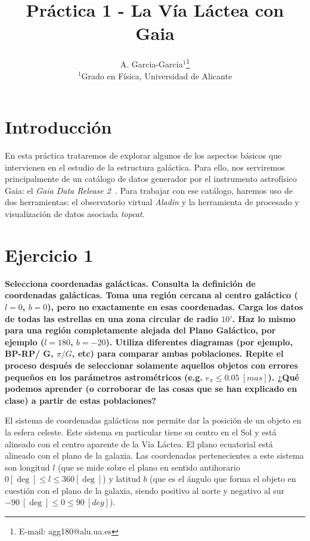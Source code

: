 \documentclass[a4paper,fleqn,usenatbib]{mnras}
\title[Short title, max. 45 characters]{Práctica 1 - La Vía Láctea con Gaia}
\author[A. Garcia-Garcia et al.]{
A. Garcia-Garcia$^{1}$\thanks{E-mail: agg180@alu.ua.es}
\\
$^{1}$Grado en Física, Universidad de Alicante\\
}
\date{}
\begin{document}
\label{firstpage}
\pagerange{\pageref{firstpage}--\pageref{lastpage}}
\maketitle





\section{Introducción}

En esta práctica trataremos de explorar algunos de los aspectos básicos que intervienen en el estudio de la estructura galáctica. Para ello, nos serviremos principalmente de un catálogo de datos generador por el instrumento astrofísico Gaia: el \emph{Gaia Data Release 2}~\cite{Gaia2018}. Para trabajar con ese catálogo, haremos uso de dos herramientas: el observatorio virtual \emph{Aladin} y la herramienta de procesado y visualización de datos asociada \emph{topcat}.

\section{Ejercicio 1}

\textbf{Selecciona coordenadas galácticas. Consulta la definición de coordenadas galácticas. Toma una región
cercana al centro galáctico ($l=0$, $b=0$), pero no exactamente en esas coordenadas. Carga los datos de
todas las estrellas en una zona circular de radio $10'$. Haz lo mismo para una región completamente alejada
del Plano Galáctico, por ejemplo ($l=180$, $b=-20$). Utiliza diferentes diagramas (por ejemplo, BP-RP/
G, $\pi/G$, etc) para comparar ambas poblaciones. Repite el proceso después de seleccionar solamente aquellos
objetos con errores pequeños en los parámetros astrométricos (e.g. $e_\pi \leq 0.05 ~[mas]$). ¿Qué podemos aprender
(o corroborar de las cosas que se han explicado en clase) a partir de estas poblaciones?}

El sistema de coordenadas galácticas nos permite dar la posición de un objeto en la esfera celeste. Este sistema en particular tiene su centro en el Sol y está alineado con el centro aparente de la Vía Láctea. El plano ecuatorial está alineado con el plano de la galaxia. Las coordenadas pertenecientes a este sistema son longitud $l$ (que se mide sobre el plano en sentido antihorario $0 [\deg] \leq l \leq 360 [\deg]$) y latitud $b$ (que es el ángulo que forma el objeto en cuestión con el plano de la galaxia, siendo positivo al norte y negativo al sur $-90~[\deg] \leq 0 \leq 90~[deg]$).
\end{document}
